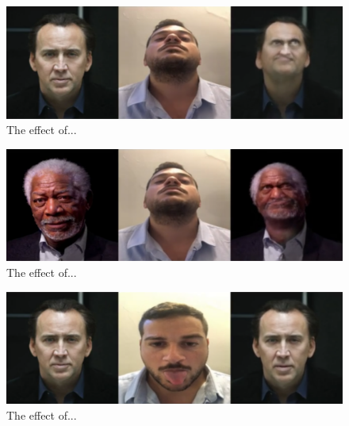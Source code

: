 \documentclass[english,12pt]{article}
\begin{document}
\begin{figure}[htb]
  \begin{centering}
      \includegraphics[scale=0.25]{images/‏‏Amit_tilt_cage.PNG}
  \par\end{centering}
  \caption{\label{fig:Amit_tilt_cage}The effect of...}
\end{figure}

\begin{figure}[htb]
  \begin{centering}
      \includegraphics[scale=0.25]{images/‏‏Amit_tilt_freeman.PNG}
  \par\end{centering}
  \caption{\label{fig:Amit_tilt_freeman}The effect of...}
\end{figure}

\begin{figure}[htb]
  \begin{centering}
      \includegraphics[scale=0.25]{images/‏‏Amit_tongue_cage.PNG}
  \par\end{centering}
  \caption{\label{fig:Amit_tongue_cage}The effect of...}
\end{figure}
\end{document}
